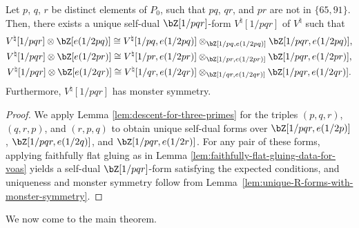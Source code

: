 \begin{lem} \label{lem:descent-for-triangle}Let $p$, $q$, $r$ be distinct elements of $P_0$, such that $pq$, $qr$, and $pr$ are not in $\{65, 91 \}$. Then, there exists a unique self-dual $\bZ[1/pqr]$-form $V^\natural[1/pqr]$ of $V^\natural$ such that
 \begin{gather*}
V^\natural[1/pqr] \otimes \bZ[e(1/2pq)] \cong V^\natural[1/pq, e(1/2pq)] \otimes_{\bZ[1/pq, e(1/2pq)]} \bZ[1/pqr, e(1/2pq)], \\
V^\natural[1/pqr] \otimes \bZ[e(1/2pr)]\cong V^\natural[1/pr, e(1/2pr)] \otimes_{\bZ[1/pr, e(1/2pr)]} \bZ[1/pqr, e(1/2pr)], \\
V^\natural[1/pqr] \otimes \bZ[e(1/2qr)]\cong V^\natural[1/qr, e(1/2qr)] \otimes_{\bZ[1/qr, e(1/2qr)]} \bZ[1/pqr, e(1/2qr)].
\end{gather*}
Furthermore, $V^\natural[1/pqr]$ has monster symmetry.
\end{lem}
\begin{proof}We apply Lemma \ref{lem:descent-for-three-primes} for the triples $(p,q,r)$, $(q,r,p)$, and $(r,p,q)$ to obtain unique self-dual forms over $\bZ[1/pqr, e(1/2p)]$, $\bZ[1/pqr, e(1/2q)]$, and $\bZ[1/pqr, e(1/2r)]$. For any pair of these forms, applying faithfully flat gluing as in Lemma \ref{lem:faithfully-flat-gluing-data-for-voas} yields a self-dual $\bZ[1/pqr]$-form satisfying the expected conditions, and uniqueness and monster symmetry follow from Lemma~\ref{lem:unique-R-forms-with-monster-symmetry}.
\end{proof}

We now come to the main theorem.

